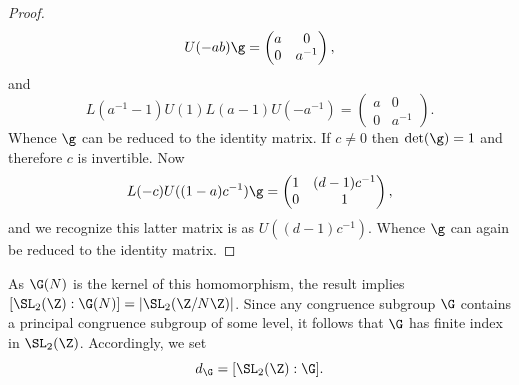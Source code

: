 \documentclass[12pt]{article}
\begin{document}
\begin{proof}
        \[
          U(-ab)\g= \begin{pmatrix} a & 0 \\ 0 & a^{-1} \end{pmatrix},
        \]
        and
        \[
          L(a^{-1}-1)U(1)L(a-1)U(-a^{-1}) = \begin{pmatrix} a & 0 \\ 0 & a^{-1} \end{pmatrix}.
        \]
        Whence \(\g\) can be reduced to the identity matrix. If \(c \neq 0\) then \(\det(\g) = 1\) and therefore \(c\) is invertible. Now
        \[
          L(-c)U((1-a)c^{-1})\g = \begin{pmatrix} 1 & (d-1)c^{-1} \\ 0 & 1 \end{pmatrix},
        \]
        and we recognize this latter matrix is as \(U((d-1)c^{-1})\). Whence \(\g\) can again be reduced to the identity matrix.
      \end{proof}
      
      As \(\G(N)\) is the kernel of this homomorphism, the result implies \([\SL_{2}(\Z):\G(N)] = |\SL_{2}(\Z/N\Z)|\). Since any congruence subgroup \(\G\) contains a principal congruence subgroup of some level, it follows that \(\G\) has finite index in \(\SL_{2}(\Z)\). Accordingly, we set
      \[
        d_{\G} = [\SL_{2}(\Z):\G].
      \]
\end{document}
